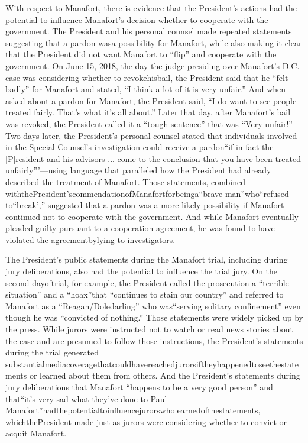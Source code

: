 With respect to Manafort, there is evidence that the President's actions had the potential to influence Manafort's decision whether to cooperate with the government. The President and his personal counsel made repeated statements suggesting that a pardon wasa possibility for Manafort, while also making it clear that the President did not want Manafort to “flip” and cooperate with the government. On June 15, 2018, the day the judge presiding over Manafort's D.C. case was considering whether to revokehisbail, the President said that he “felt badly” for Manafort and stated, “I think a lot of it is very unfair.” And when asked about a pardon for Manafort, the President said, “I do want to see people treated fairly. That's what it's all about.” Later that day, after Manafort's bail was revoked, the President called it a “tough sentence” that was “Very unfair!” Two days later, the President's personal counsel stated that individuals involved in the Special Counsel's investigation could receive a pardon“if in fact the [P]resident and his advisors ... come to the conclusion that you have been treated unfairly”'—using language that paralleled how the President had already described the treatment of Manafort. Those statements, combined withthePresident'scommendationofManafortforbeinga“brave man”who“refused to“break',” suggested that a pardon was a more likely possibility if Manafort continued not to cooperate with the government. And while Manafort eventually pleaded guilty pursuant to a cooperation agreement, he was found to have violated the agreementbylying to investigators.

The President's public statements during the Manafort trial, including during jury deliberations, also had the potential to influence the trial jury. On the second dayoftrial, for example, the President called the prosecution a “terrible situation” and a “hoax”that “continues to stain our country” and referred to Manafort as a “Reagan/Doledarling” who was“serving solitary confinement” even though he was “convicted of nothing.” Those statements were widely picked up by the press. While jurors were instructed not to watch or read news stories about the case and are presumed to follow those instructions, the President's statements during the trial generated substantialmediacoveragethatcouldhavereachedjurorsiftheyhappenedtoseethestatements or learned about them from others. And the President's statements during jury deliberations that Manafort “happens to be a very good person” and that“it's very sad what they've done to Paul Manafort”hadthepotentialtoinfluencejurorswholearnedofthestatements, whichthePresident made just as jurors were considering whether to convict or acquit Manafort.

